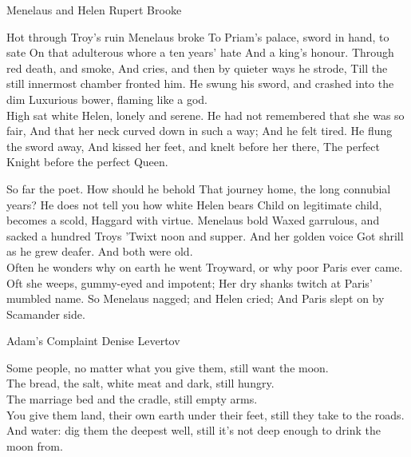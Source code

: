 \begin{poem}
{Menelaus and Helen}
{Rupert Brooke}
\newcommand{\Ind}{\Indent[2em]}


Hot through Troy's ruin Menelaus broke
\Ind   To Priam's palace, sword in hand, to sate
\Ind   On that adulterous whore a ten years' hate
And a king's honour. Through red death, and smoke,
And cries, and then by quieter ways he strode,
\Ind   Till the still innermost chamber fronted him.
\Ind   He swung his sword, and crashed into the dim
Luxurious bower, flaming like a god. \\

High sat white Helen, lonely and serene.
\Ind   He had not remembered that she was so fair,
And that her neck curved down in such a way;
And he felt tired. He flung the sword away,
\Ind   And kissed her feet, and knelt before her there,
The perfect Knight before the perfect Queen. \\



So far the poet. How should he behold
\Ind   That journey home, the long connubial years?
\Ind   He does not tell you how white Helen bears
Child on legitimate child, becomes a scold,
Haggard with virtue. Menelaus bold
\Ind   Waxed garrulous, and sacked a hundred Troys
\Ind   'Twixt noon and supper. And her golden voice
Got shrill as he grew deafer. And both were old. \\

Often he wonders why on earth he went
\Ind   Troyward, or why poor Paris ever came.
Oft she weeps, gummy-eyed and impotent;
\Ind   Her dry shanks twitch at Paris' mumbled name.
So Menelaus nagged; and Helen cried;
And Paris slept on by Scamander side. 
\end{poem}

\begin{poem}
{Adam's Complaint}
{Denise Levertov}

 Some people,
 no matter what you give them,
 still want the moon.\\

 The bread,
 the salt,
 white meat and dark,
 still hungry.\\

 The marriage bed
 and the cradle,
 still empty arms.\\

 You give them land,
 their own earth under their feet,
 still they take to the roads.\\

 And water: dig them the deepest well,
 still it's not deep enough
 to drink the moon from.
\end{poem}



